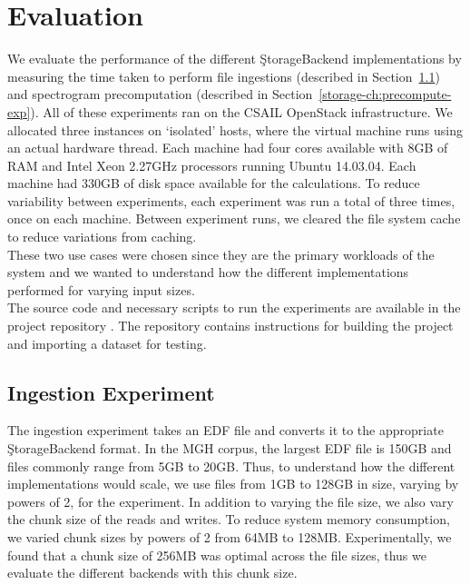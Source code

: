 \section{Evaluation}\label{storage-ch:evaluation}

We evaluate the performance of the different \c{StorageBackend} implementations
by measuring the time taken to perform file ingestions (described in
Section~\ref{storage-ch:ingestion-exp}) and spectrogram precomputation
(described in Section~\ref{storage-ch:precompute-exp}). All of these
experiments ran on the CSAIL OpenStack infrastructure. We allocated three
instances on `isolated' hosts, where the virtual machine runs using an actual
hardware thread. Each machine had four cores available with 8GB of RAM and
Intel Xeon 2.27GHz processors running Ubuntu 14.03.04. Each machine had 330GB
of disk space available for the calculations. To reduce variability between
experiments, each experiment was run a total of three times, once on each
machine. Between experiment runs, we cleared the file system cache to reduce
variations from caching. \\

These two use cases were chosen since they are the primary workloads of the
system and we wanted to understand how the different implementations performed
for varying input sizes.\\

The source code and necessary scripts to run the experiments are available
in the project repository \cite{eeg-toolkit}. The repository contains
instructions for building the project and importing a dataset for testing.

\subsection{Ingestion Experiment}\label{storage-ch:ingestion-exp}

The ingestion experiment takes an EDF file and converts it to the appropriate
\c{StorageBackend} format. In the MGH corpus, the largest EDF file is 150GB and
files commonly range from 5GB to 20GB. Thus, to understand how the different
implementations would scale, we use files from 1GB to 128GB in size, varying by
powers of 2, for the experiment. In addition to varying the file size, we also
vary the chunk size of the reads and writes. To reduce system memory
consumption, we varied chunk sizes by powers of 2 from 64MB to 128MB.
Experimentally, we found that a chunk size of 256MB was optimal across the file
sizes, thus we evaluate the different backends with this chunk size. \\

